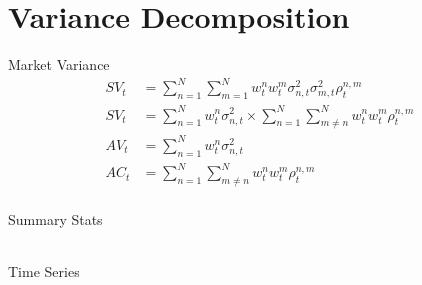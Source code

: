 \documentclass{beamer}
\begin{document}
\section{Variance Decomposition}

\begin{frame}{Market Variance}
	\begin{align}
	SV_{t} &= \sum_{n=1}^{N} \sum_{m=1}^{N}w^{n}_{t}w^{m}_{t}\sigma^{2}_{n,t}\sigma^{2}_{m,t}\rho^{n,m}_{t}\\
	SV_{t} &= \sum_{n=1}^{N} w^{n}_{t}\sigma^{2}_{n,t} \times \sum_{n=1}^{N}\sum_{m \neq n}^{N}w^{n}_{t}w^{m}_{t}\rho^{n,m}_{t}\\
	AV_{t} &= \sum_{n=1}^{N} w^{n}_{t}\sigma^{2}_{n,t}\\
	AC_{t} &= \sum_{n=1}^{N}\sum_{m \neq n}^{N}w^{n}_{t}w^{m}_{t}\rho^{n,m}_{t}\\
	\end{align}
\end{frame}

\begin{frame}{Summary Stats}
	\begin{table}[!htbp] \centering 
		\begin{adjustbox}{width=\textwidth}
			\begin{tabular}{lcccccc} 
				
				
			\end{tabular}
		\end{adjustbox}
	\end{table}
\end{frame}

\begin{frame}{Time Series}
	\begin{adjustbox}{width=\textwidth}
			
	\end{adjustbox}
\end{frame}
\end{document}

